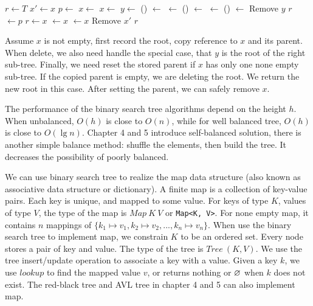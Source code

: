 \documentclass[b5paper]{article}
\begin{document}
\begin{algorithmic}[1]
  \State $r \gets T$
  \State $x' \gets x$ 
  \State $p \gets $ 
    \State $x \gets $ 
    \State $x \gets $ 
  \Else
    \State  $y \gets $ ()
    \State {} $\gets$ 
    \State {} $\gets$ 
      \State {}() $\gets$ 
    \Else
      \State {} $\gets$ 
    \EndIf
      \State {}() $\gets$ 
    \EndIf
    \State Remove $y$
    \State \Return $r$
  \EndIf
    \State {} $\gets p$
  \EndIf
    \State $r \gets x$
  \Else
      \State {} $\gets x$
    \Else
      \State {} $\gets x$
    \EndIf
  \EndIf
  \State Remove $x'$
  \State \Return $r$
\EndFunction
\end{algorithmic}

Assume $x$ is not empty, first record the root, copy reference to $x$ and its parent. When delete, we also need handle the special case, that $y$ is the root of the right sub-tree. Finally, we need reset the stored parent if $x$ has only one none empty sub-tree. If the copied parent is empty, we are deleting the root. We return the new root in this case. After setting the parent, we can safely remove $x$.

 \label{sec:bst-random-build}
The performance of the binary search tree algorithms depend on the height $h$. When unbalanced, $O(h)$ is close to $O(n)$, while for well balanced tree, $O(h)$ is close to $O(\lg n)$. Chapter 4 and 5 introduce self-balanced solution, there is another simple balance method: shuffle the elements, then build the tree\cite{CLRS}. It decreases the possibility of poorly balanced.

We can use binary search tree to realize the map data structure (also known as associative data structure or dictionary). A finite map is a collection of key-value pairs. Each key is unique, and mapped to some value. For keys of type $K$, values of type $V$, the type of the map is $Map\ K\ V$ or \texttt{Map<K, V>}. For none empty map, it contains $n$ mappings of $\{k_1 \mapsto v_1, k_2 \mapsto v_2, ..., k_n \mapsto v_n\}$. When use the binary search tree to implement map, we constrain $K$ to be an ordered set. Every node stores a pair of key and value. The type of the tree is $Tree\ (K, V)$. We use the tree insert/update operation to associate a key with a value. Given a key $k$, we use $lookup$ to find the mapped value $v$, or returns nothing or $\varnothing$ when $k$ does not exist. The red-black tree and AVL tree in chapter 4 and 5 can also implement map.
\end{document}
